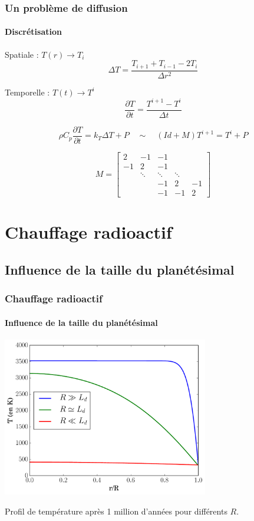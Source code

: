 \documentclass{beamer}
\begin{document}
\begin{frame}
	\frametitle{Un problème de diffusion}
	\framesubtitle{Discrétisation}
	

Spatiale : $T(r) \rightarrow T_i$ 
$$\Delta T = \frac{T_{i+1} + T_{i-1} - 2T_{i}}{\Delta r ^2} $$ 


Temporelle : $T(t) \rightarrow T^i$ 
$$\dfrac{\partial T}{\partial t} = \frac{T^{i+1}-T^{i}}{\Delta t} $$


$$\rho C_p \dfrac{\partial T}{\partial t}= k_{T} \Delta T  + P
\quad \sim \quad (Id + M) T^{i+1}=T^i + P$$


$$
M =
\begin{bmatrix}
    2      & -1     & -1        &      &     \\
    -1      &  2     & -1        &     &              \\
     & \ddots & \ddots    & \ddots &       \\
 &     &  -1      &  2     & -1                      \\
     &    &    -1      & -1     & 2          
\end{bmatrix}
$$

\end{frame}

\section{Chauffage radioactif}
\subsection{Influence de la taille du planétésimal}

\begin{frame}
	\frametitle{Chauffage radioactif}
	\framesubtitle{Influence de la taille du planétésimal}
\vspace{-0.5cm}

\center \includegraphics[width = 9cm]{figures/diffusion2.pdf} 
 
Profil de température après 1 million d'années pour différents $R$.


	  	
\end{frame}
\end{document}
